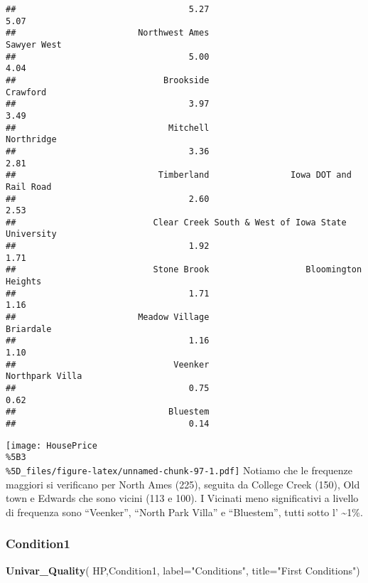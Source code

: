 \documentclass[
]{article}
\newenvironment{Shaded}{\begin{snugshade}}{\end{snugshade}}
\newcommand{\AttributeTok}[1]{\textcolor[rgb]{0.13,0.29,0.53}{#1}}
\newcommand{\FunctionTok}[1]{\textcolor[rgb]{0.13,0.29,0.53}{\textbf{#1}}}
\newcommand{\NormalTok}[1]{#1}
\newcommand{\StringTok}[1]{\textcolor[rgb]{0.31,0.60,0.02}{#1}}
\begin{document}
\begin{verbatim}
##                                  5.27                                  5.07 
##                        Northwest Ames                           Sawyer West 
##                                  5.00                                  4.04 
##                             Brookside                              Crawford 
##                                  3.97                                  3.49 
##                              Mitchell                            Northridge 
##                                  3.36                                  2.81 
##                            Timberland                Iowa DOT and Rail Road 
##                                  2.60                                  2.53 
##                           Clear Creek South & West of Iowa State University 
##                                  1.92                                  1.71 
##                           Stone Brook                   Bloomington Heights 
##                                  1.71                                  1.16 
##                        Meadow Village                             Briardale 
##                                  1.16                                  1.10 
##                               Veenker                       Northpark Villa 
##                                  0.75                                  0.62 
##                              Bluestem 
##                                  0.14
\end{verbatim}

\texttt{[image: HousePrice\\\%5B3\\\%5D\_files/figure-latex/unnamed-chunk-97-1.pdf]}
Notiamo che le frequenze maggiori si verificano per North Ames (225),
seguita da College Creek (150), Old town e Edwards che sono vicini (113
e 100). I Vicinati meno significativi a livello di frequenza sono
``Veenker'', ``North Park Villa'' e ``Bluestem'', tutti sotto l'
\textasciitilde1\%.

\subsubsection{Condition1}\label{condition1}

\begin{Shaded}
\begin{Highlighting}[]
\FunctionTok{Univar\_Quality}\NormalTok{(}
\NormalTok{  HP,Condition1,}
  \AttributeTok{label=}\StringTok{"Conditions"}\NormalTok{,}
  \AttributeTok{title=}\StringTok{"First Conditions"}\NormalTok{)}
\end{Highlighting}
\end{Shaded}
\end{document}
